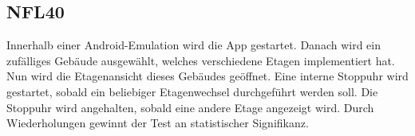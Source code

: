 \subsection*{NFL40}

Innerhalb einer Android-Emulation wird die App gestartet.
Danach wird ein zufälliges Gebäude ausgewählt, welches verschiedene Etagen implementiert hat.
Nun wird die Etagenansicht dieses Gebäudes geöffnet.
Eine interne Stoppuhr wird gestartet, sobald ein beliebiger Etagenwechsel durchgeführt werden soll.
Die Stoppuhr wird angehalten, sobald eine andere Etage angezeigt wird.
Durch Wiederholungen gewinnt der Test an statistischer Signifikanz.